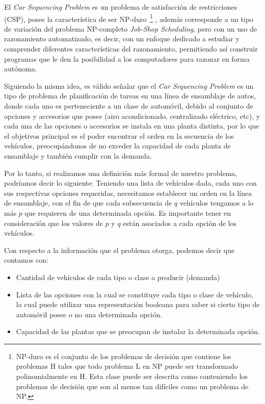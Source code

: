 %

El \emph{Car Sequencing Problem} es un problema de satisfacción de restricciones (CSP), posee la
característica de ser NP-duro~\footnote{
NP-duro es el conjunto de los problemas de decisión que contiene los problemas H
tales que todo problema L en NP puede ser transformado polinomialmente en H.
Esta clase puede ser descrita como conteniendo los problemas de decisión que son
al menos tan difíciles como un problema de NP.}
, además corresponde a un tipo de variación del problema NP-completo \emph{Job-Shop Scheduling},
pero con un uso de razonamiento automatizado, es decir, con un enfoque dedicado a estudiar y comprender
diferentes características del razonamiento, permitiendo así construir programas que le den la posibilidad
a los computadores para razonar en forma autónoma.
 
Siguiendo la misma idea, es válido señalar que el \emph{Car Sequencing Problem} es un tipo de problema de planificación
de tareas en una línea de ensamblaje de autos, donde cada uno es perteneciente a un clase de automóvil, debido al conjunto
de opciones y accesorios que posee (airo acondicionado, centralizado eléctrico, etc), y cada una de las opciones o
accesorios se instala en una planta distinta, por lo que el objetivos principal es el poder encontrar el orden en la
secuencia de los vehículos, preocupándonos de no exceder la capacidad de cada planta de ensamblaje y también cumplir con la demanda.

Por lo tanto, si realizamos una definición más formal de nuestro problema, podríamos decir lo siguiente:
Teniendo una lista de vehículos dada, cada uno con sus respectivas opciones requeridas,
necesitamos establecer un orden en la línea de ensamblaje, con el fin de que cada subsecuencia de $q$ vehículos
tengamos a lo más $p$ que requieren de una determinada opción. Es importante tener en consideración que los
valores de $p$ y $q$ están asociados a cada opción de los vehículos.

Con respecto a la información que el problema otorga, podemos decir que contamos con:
\begin{itemize}
	\item Cantidad de vehículos de cada tipo o clase a producir (demanda)
	\item Lista de las opciones con la cual se constituye cada tipo o clase de vehículo, la cual puede utilizar una representación
		booleana para saber si cierto tipo de automóvil posee o no una determinada opción.
	\item Capacidad de las plantas que se preocupan de instalar la determinada opción.
\end{itemize}

